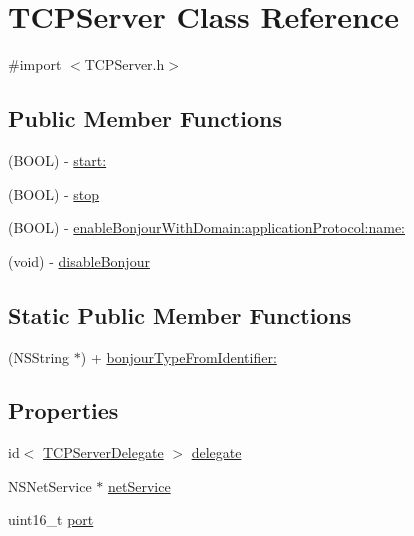 \hypertarget{interface_t_c_p_server}{
\section{TCPServer Class Reference}
\label{interface_t_c_p_server}
}


{\ttfamily \#import $<$TCPServer.h$>$}

\subsection*{Public Member Functions}
\begin{DoxyCompactItemize}
\item 
(BOOL) -\/ \hyperlink{interface_t_c_p_server_a4f5ccd60101c92c274f39d73cb2cd240}{start:}
\item 
(BOOL) -\/ \hyperlink{interface_t_c_p_server_a7bee99ce2238a838f9909c87b1b7ae36}{stop}
\item 
(BOOL) -\/ \hyperlink{interface_t_c_p_server_a138dad88adf5026bf7c2a0f6c09bbf64}{enableBonjourWithDomain:applicationProtocol:name:}
\item 
(void) -\/ \hyperlink{interface_t_c_p_server_abf3dab105d01290e617522eb7573948e}{disableBonjour}
\end{DoxyCompactItemize}
\subsection*{Static Public Member Functions}
\begin{DoxyCompactItemize}
\item 
(NSString $\ast$) + \hyperlink{interface_t_c_p_server_ac5f92c26e9def6b8acffd0471ab4ad94}{bonjourTypeFromIdentifier:}
\end{DoxyCompactItemize}
\subsection*{Properties}
\begin{DoxyCompactItemize}
\item 
id$<$ \hyperlink{protocol_t_c_p_server_delegate-p}{TCPServerDelegate} $>$ \hyperlink{interface_t_c_p_server_a13a8a34ddb4e3e1d8175da5cbb575b94}{delegate}
\item 
NSNetService $\ast$ \hyperlink{interface_t_c_p_server_a36376bb50bc0e6bba06d8508dd3bc61b}{netService}
\item 
uint16\_\-t \hyperlink{interface_t_c_p_server_a8e0798404bf2cf5dabb84c5ba9a4f236}{port}
\end{DoxyCompactItemize}


